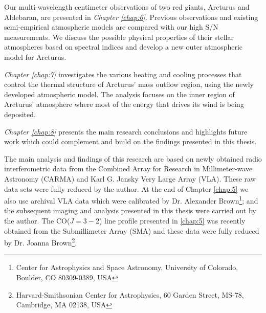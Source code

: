 Our multi-wavelength centimeter observations of two red giants, Arcturus and Aldebaran, are presented in \textit{Chapter \ref{chap:6}}. Previous observations and existing semi-empirical atmospheric models are compared with our high S/N measurements. We discuss the possible physical properties of their stellar atmospheres based on spectral indices and develop a new outer atmospheric model for Arcturus.

\textit{Chapter \ref{chap:7}} investigates the various heating and cooling processes that control the thermal structure of Arcturus' mass outflow region, using the newly developed atmospheric model. The analysis focuses on the inner region of Arcturus' atmosphere where most of the energy that drives its wind is being deposited. 

\textit{Chapter \ref{chap:8}} presents the main research conclusions and highlights future work which could complement and build on the findings presented in this thesis.

The main analysis and findings of this research are based on newly obtained radio interferometric data from the Combined Array for Research in Millimeter-wave Astronomy (CARMA) and Karl G. Jansky Very Large Array (VLA). These raw data sets were fully reduced by the author. At the end of Chapter \ref{chap:5} we also use archival VLA data which were calibrated by Dr. Alexander Brown\footnote{Center for Astrophysics and Space Astronomy, University of Colorado, Boulder, CO 80309-0389, USA}; and the subsequent imaging and analysis presented in this thesis were carried out by the author. The CO($J=3-2$) line profile presented in \ref{chap:5} was recently obtained from the Submillimeter Array (SMA) and these data were fully reduced by Dr. Joanna Brown\footnote{Harvard-Smithsonian Center for Astrophysics, 60 Garden Street, MS-78, Cambridge, MA 02138, USA}.